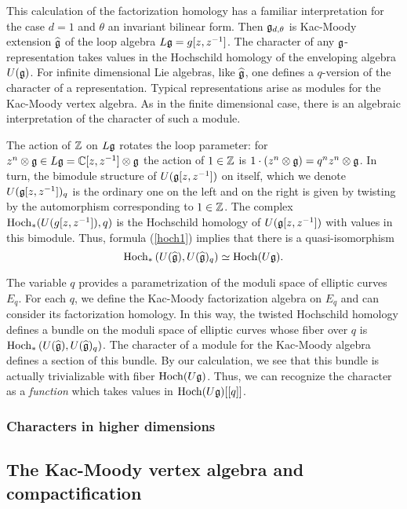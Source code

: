 This calculation of the factorization homology has a familiar interpretation for the case $d=1$ and $\theta$ an invariant bilinear form. 
Then $\mathfrak g_{d,\theta}$ is Kac-Moody extension $\widehat{\mathfrak g}$ of the loop algebra $L\mathfrak g = g [z,z^{-1}]$. 
The character of any $\mathfrak g$-representation takes values in the Hochschild homology of the enveloping algebra $U(\mathfrak g)$. 
For infinite dimensional Lie algebras, like $\widehat{\mathfrak g}$, one defines a $q$-version of the character of a representation.
Typical representations arise as modules for the Kac-Moody vertex algebra.  
As in the finite dimensional case, there is an algebraic interpretation of the character of such a module. 

The action of $\mathbb Z$ on $L\mathfrak g$ rotates the loop parameter: for $z^n \otimes \mathfrak g \in L \mathfrak g = \mathbb C[z,z^{-1}] \otimes \mathfrak g$ the action of $1 \in \mathbb Z$ is $1 \cdot (z^n \otimes \mathfrak g) = q^n z^n \otimes \mathfrak g$. 
In turn, the bimodule structure of $U(\mathfrak g[z,z^{-1}])$ on itself, which we denote $U(\mathfrak g[z,z^{-1}])_q$ is the ordinary one on the left and on the right is given by twisting by the automorphism corresponding to $1 \in \mathbb Z$. 
The complex ${\rm Hoch}_*(U(g[z,z^{-1}]), q)$ is the Hochschild homology of $U(\mathfrak g[z,z^{-1}])$ with values in this bimodule.
Thus, formula (\ref{hoch1}) implies that there is a quasi-isomorphism
\[
{\rm Hoch}_*\left(U(\widehat{\mathfrak g}), U(\widehat{\mathfrak g})_q \right) \simeq {\rm Hoch}(U \mathfrak g) . 
\]

The variable $q$ provides a parametrization of the moduli space of elliptic curves $E_q$. 
For each $q$, we define the Kac-Moody factorization algebra on $E_q$ and can consider its factorization homology.
In this way, the twisted Hochschild homology defines a bundle on the moduli space of elliptic curves whose fiber over $q$ is ${\rm Hoch}_*\left(U(\widehat{\mathfrak g}), U(\widehat{\mathfrak g})_q \right)$. 
The character of a module for the Kac-Moody algebra defines a section of this bundle. 
By our calculation, we see that this bundle is actually trivializable with fiber ${\rm Hoch}(U \mathfrak g)$.
Thus, we can recognize the character as a {\em function} which takes values in ${\rm Hoch}(U \mathfrak g) [[q]]$. 

\subsubsection{Characters in higher dimensions}


\subsection{The Kac-Moody vertex algebra and compactification} 

